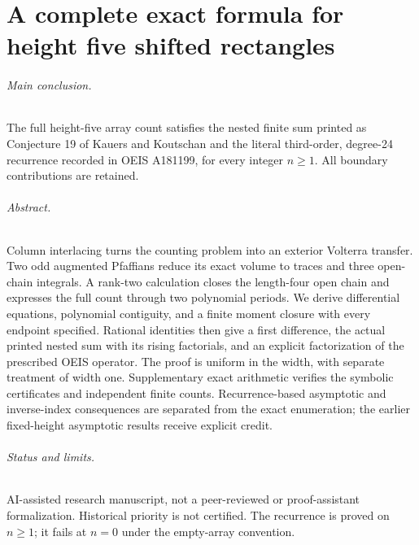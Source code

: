 \documentclass[11pt,letterpaper]{article}
\numberwithin{equation}{section}
\theoremstyle{definition}
\newcommand{\1}{\mathbf 1}
\begin{document}
\clearpage
\part{A complete exact formula for height five shifted rectangles}
\label{shr:h5:part}

\smallskip
{}
\medskip

\paragraph{Main conclusion.}
The full height-five array count satisfies the nested finite sum printed as
Conjecture 19 of Kauers and Koutschan and the literal third-order,
degree-24 recurrence recorded in OEIS A181199, for every integer $n\ge1$.
All boundary contributions are retained.

\paragraph{Abstract.}
Column interlacing turns the counting problem into an exterior Volterra
transfer. Two odd augmented Pfaffians reduce its exact volume to traces
and three open-chain integrals. A rank-two calculation closes the
length-four open chain and expresses the full count through two polynomial
periods. We derive differential equations, polynomial contiguity, and a
finite moment closure with every endpoint specified. Rational identities
then give a first difference, the actual printed nested sum with its
rising factorials, and an explicit factorization of the prescribed OEIS
operator. The proof is uniform in the width, with separate treatment of
width one. Supplementary exact arithmetic verifies the symbolic
certificates and independent finite counts. Recurrence-based asymptotic
and inverse-index consequences are separated from the exact enumeration;
the earlier fixed-height asymptotic results receive explicit credit.

\paragraph{Status and limits.}
AI-assisted research manuscript, not a peer-reviewed or proof-assistant
formalization. Historical priority is not certified. The recurrence is
proved on $n\ge1$; it fails at $n=0$ under the empty-array convention.
\end{document}
